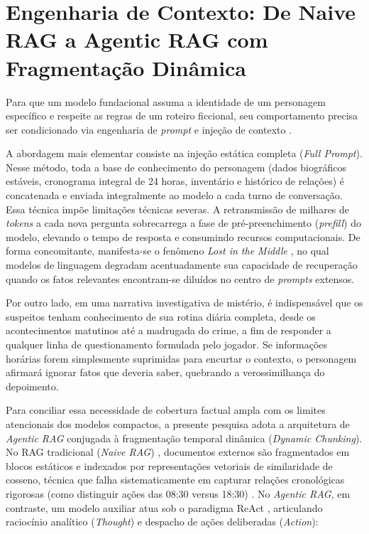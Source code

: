 \section{Engenharia de Contexto: De Naive RAG a Agentic RAG com Fragmentação Dinâmica}
\label{sec:ref_rag}

Para que um modelo fundacional assuma a identidade de um personagem específico e respeite as regras de um roteiro ficcional, seu comportamento precisa ser condicionado via engenharia de \textit{prompt} e injeção de contexto \cite{shanahan2023role}.

A abordagem mais elementar consiste na injeção estática completa (\textit{Full Prompt}). Nesse método, toda a base de conhecimento do personagem (dados biográficos estáveis, cronograma integral de 24 horas, inventário e histórico de relações) é concatenada e enviada integralmente ao modelo a cada turno de conversação. Essa técnica impõe limitações técnicas severas. A retransmissão de milhares de \textit{tokens} a cada nova pergunta sobrecarrega a fase de pré-preenchimento (\textit{prefill}) do modelo, elevando o tempo de resposta e consumindo recursos computacionais. De forma concomitante, manifesta-se o fenômeno \textit{Lost in the Middle} \cite{liu2024lost}, no qual modelos de linguagem degradam acentuadamente sua capacidade de recuperação quando os fatos relevantes encontram-se diluídos no centro de \textit{prompts} extensos.

Por outro lado, em uma narrativa investigativa de mistério, é indispensável que os suspeitos tenham conhecimento de sua rotina diária completa, desde os acontecimentos matutinos até a madrugada do crime, a fim de responder a qualquer linha de questionamento formulada pelo jogador. Se informações horárias forem simplesmente suprimidas para encurtar o contexto, o personagem afirmará ignorar fatos que deveria saber, quebrando a verossimilhança do depoimento. 

Para conciliar essa necessidade de cobertura factual ampla com os limites atencionais dos modelos compactos, a presente pesquisa adota a arquitetura de \textit{Agentic RAG} conjugada à fragmentação temporal dinâmica (\textit{Dynamic Chunking}). No RAG tradicional (\textit{Naive RAG}) \cite{lewis2020retrieval}, documentos externos são fragmentados em blocos estáticos e indexados por representações vetoriais de similaridade de cosseno, técnica que falha sistematicamente em capturar relações cronológicas rigorosas (como distinguir ações das 08:30 versus 18:30) \cite{ahn2024timechara}. No \textit{Agentic RAG}, em contraste, um modelo auxiliar atua sob o paradigma ReAct \cite{yao2023react}, articulando raciocínio analítico (\textit{Thought}) e despacho de ações deliberadas (\textit{Action}):

